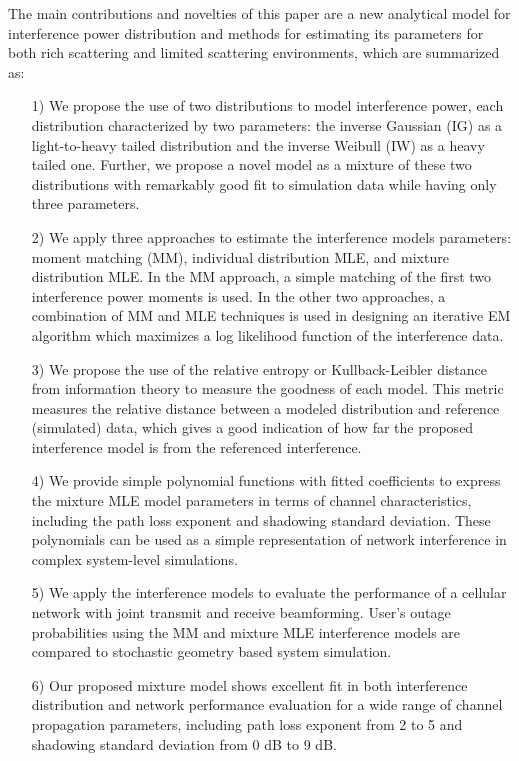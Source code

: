 \documentclass[12pt, draftclsnofoot, onecolumn]{IEEEtran}
\theoremstyle{plain}
\begin{document}
The main contributions and novelties of this paper are a new analytical model for interference power distribution and methods for estimating its parameters for both rich scattering and limited scattering environments, which are summarized as:

\begin{enumerate}%
\item[1)] We propose the use of two distributions to model interference power, each distribution characterized by two parameters: the {inverse Gaussian} (IG) as a light-to-heavy tailed distribution and the {inverse Weibull} (IW) as a heavy tailed {one}. Further, we propose a novel model as a mixture of these two distributions with remarkably good fit to simulation data while having only three  parameters.

\item[2)] We apply three approaches to estimate the interference models parameters: moment matching (MM), individual distribution MLE, and mixture distribution MLE. In the MM approach, a simple matching of the first two %
interference power moments is used. 
In the other two approaches, a combination of MM and MLE techniques is used in designing an iterative EM algorithm which maximizes a log likelihood function of the interference data.

\item[3)] We propose the use of the relative entropy or Kullback-Leibler distance from information theory to measure the goodness of each model. This metric measures the relative distance between a modeled distribution and reference (simulated) data, which gives a good indication of how far the proposed interference model is from the referenced interference.

\item[4)] We provide simple polynomial functions with fitted coefficients to express the mixture MLE model parameters in terms of channel characteristics, including the path loss exponent and shadowing standard deviation. These polynomials can be used as a simple representation of network interference in complex system-level simulations.

\item[5)] We apply the interference models to evaluate the performance of a cellular network with joint transmit and receive  beamforming. User's outage probabilities using the MM and mixture MLE interference models are compared to stochastic geometry based system simulation. %

\item[6)] Our proposed mixture model shows excellent fit in both interference distribution and network performance evaluation for a wide range of {channel} propagation parameters, including path loss exponent from 2 to 5 and shadowing standard deviation from 0 dB to 9 dB. 
\end{enumerate}
\end{document}
